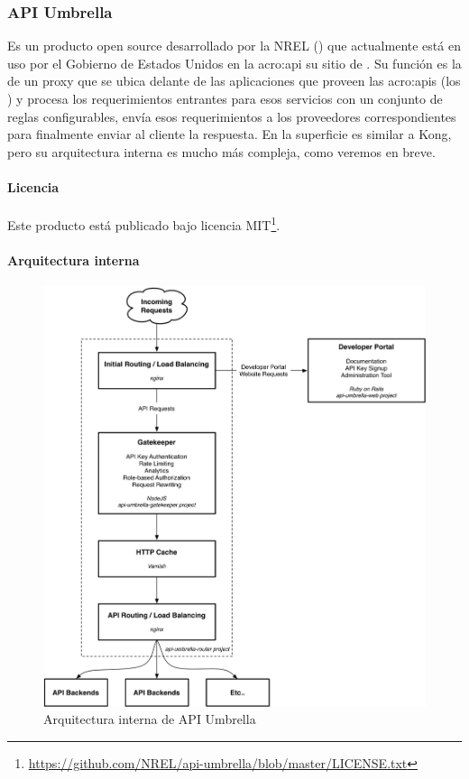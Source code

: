 \subsubsection{API Umbrella}
\label{soa:tecnologias:api-umbrella}

Es un producto open source desarrollado por la NREL () que actualmente está en uso por el Gobierno de Estados Unidos en la \gls{acro:api} su sitio de . Su función es la de un proxy que se ubica delante de las aplicaciones que proveen las \glspl{acro:api} (los ) y procesa los requerimientos entrantes para esos servicios con un conjunto de reglas configurables, envía esos requerimientos a los proveedores correspondientes para finalmente enviar al cliente la respuesta. En la superficie es similar a Kong, pero su arquitectura interna es mucho más compleja, como veremos en breve.

\paragraph{Licencia}

Este producto está publicado bajo licencia MIT\footnote{\url{https://github.com/NREL/api-umbrella/blob/master/LICENSE.txt}}.

\paragraph{Arquitectura interna}

\begin{figure}
  \includegraphics[width=\linewidth]{src/images/03-capitulo-3/tecnologias/api-umbrella/api-umbrella-arq.png}
  \caption{Arquitectura interna de API Umbrella}
  \label{fig:arquitectura-interna-api-umbrella}
\end{figure}

